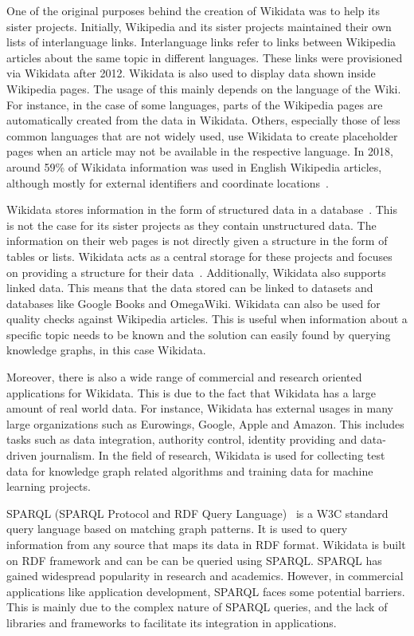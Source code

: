 One of the original purposes behind the creation of Wikidata was to help its sister projects. Initially, Wikipedia and its sister projects maintained their own lists of interlanguage links. Interlanguage links refer to links between Wikipedia articles about the same topic in different languages. These links were provisioned via Wikidata after 2012. Wikidata is also used to display data shown inside Wikipedia pages. The usage of this mainly depends on the language of the Wiki. For instance, in the case of some languages, parts of the Wikipedia pages are automatically created from the data in Wikidata. Others, especially those of less common languages that are not widely used, use Wikidata to create placeholder pages when an article may not be available in the respective language. In 2018, around 59\% of Wikidata information was used in English Wikipedia articles, although mostly for external identifiers and coordinate locations~\cite{Wikipedia2017}. 

Wikidata stores information in the form of structured data in a database~\cite{Tharani2021}. This is not the case for its sister projects as they contain unstructured data. The information on their web pages is not directly given a structure in the form of tables or lists. Wikidata acts as a central storage for these projects and focuses on providing a structure for their data~\cite{Wikidata2014}. Additionally, Wikidata also supports linked data. This means that the data stored can be linked to datasets and databases like Google Books and OmegaWiki. Wikidata can also be used for quality checks against Wikipedia articles. This is useful when information about a specific topic needs to be known and the solution can easily found by querying knowledge graphs, in this case Wikidata.

Moreover, there is also a wide range of commercial and research oriented applications for Wikidata. This is due to the fact that Wikidata has a large amount of real world data. For instance, Wikidata has external usages in many large organizations such as Eurowings, Google, Apple and Amazon. This includes tasks such as data integration, authority control, identity providing and data-driven journalism. In the field of research, Wikidata is used for collecting test data for knowledge graph related algorithms and training data for machine learning projects.

SPARQL (SPARQL Protocol and RDF Query Language)~\cite{C.B.Aranda2013} is a W3C standard query language based on matching graph patterns. It is used to query information from any source that maps its data in RDF format. Wikidata is built on RDF framework and can be can be queried using SPARQL. SPARQL has gained widespread popularity in research and academics. However, in commercial applications like application development, SPARQL faces some potential barriers. This is mainly due to the complex nature of SPARQL queries, and the lack of libraries and frameworks to facilitate its integration in applications. 

